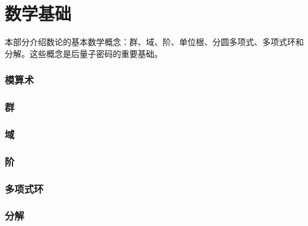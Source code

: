 \documentclass[11pt]{article}
\begin{document}
\clearpage



\part{数学基础}
\label{part:basic-math}

\renewcommand{\thesection}{A-\arabic{section}}
\setcounter{section}{0}

本部分介绍数论的基本数学概念：群、域、阶、单位根、分圆多项式、多项式环和分解。这些概念是后量子密码的重要基础。

\clearpage

\section{模算术}
\label{sec:modulo}


\clearpage

\section{群}
\label{sec:group}



\clearpage

\section{域}
\label{sec:field}


\clearpage

\section{阶}
\label{sec:order}




\clearpage

\section{多项式环}
\label{sec:polynomial-ring}


\clearpage

\section{分解}
\label{sec:decomp}

\end{document}
